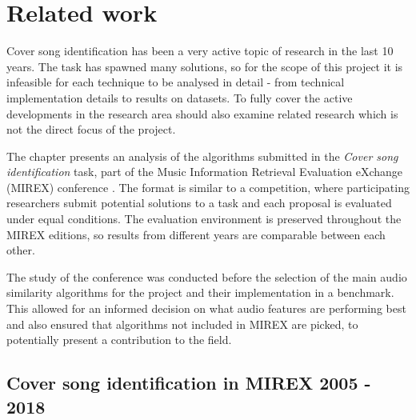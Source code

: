 
\chapter{Related work}
\label{chap:relatedwork}
\ifpdf
    \graphicspath{{RelatedWork/Figures/PNG/}{RelatedWork/Figures/PDF/}{RelatedTerminology/Figures/}}
\else
    \graphicspath{{RelatedWork/Figures/EPS/}{RelatedWork/Figures/}}
\fi




Cover song identification has been a very active topic of research in the last
10 years. The task has spawned many solutions, so for the scope of this project
it is infeasible for each technique to be analysed in detail - from technical
implementation details to results on datasets. To fully cover the active
developments in the research area should also examine related
research which is not the direct focus of the project.

The chapter presents an analysis of the algorithms submitted in the
\textit{Cover song identification} task, part of the Music Information Retrieval
Evaluation eXchange (MIREX) conference \cite{mirex}. The format is similar to a
competition, where participating researchers submit potential solutions to a
task and each proposal is evaluated under equal conditions. The evaluation
environment is preserved throughout the MIREX editions, so results from
different years are comparable between each other.

The study of the conference was conducted before the selection of the main
audio similarity algorithms for the project and their implementation in a
benchmark. This allowed for an informed decision on what audio features are
performing best and also ensured that algorithms not included in MIREX are
picked, to potentially present a contribution to the field.

\section{Cover song identification in MIREX 2005 - 2018}
\label{sec:scientificpaper}


